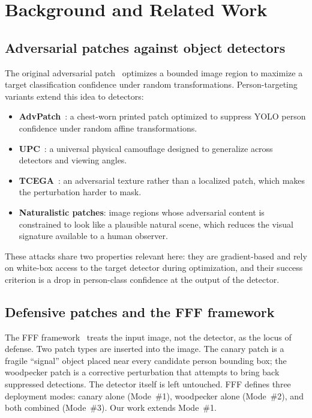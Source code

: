 \documentclass[conference]{IEEEtran}
\begin{document}
\section{Background and Related Work}
\label{sec:bg}

\subsection{Adversarial patches against object detectors}

The original adversarial patch~\cite{brown2017adversarial} optimizes a
bounded image region to maximize a target classification confidence under
random transformations. Person-targeting variants extend this idea to
detectors:

\begin{itemize}[leftmargin=*]
    \item \textbf{AdvPatch}~\cite{thys2019fooling}: a chest-worn printed
    patch optimized to suppress YOLO person confidence under random affine
    transformations.
    \item \textbf{UPC}~\cite{huang2020upc}: a universal physical camouflage
    designed to generalize across detectors and viewing angles.
    \item \textbf{TCEGA}~\cite{hu2022tcega}: an adversarial texture rather
    than a localized patch, which makes the perturbation harder to mask.
    \item \textbf{Naturalistic patches}: image regions whose adversarial
    content is constrained to look like a plausible natural scene, which
    reduces the visual signature available to a human observer.
\end{itemize}

These attacks share two properties relevant here: they are gradient-based
and rely on white-box access to the target detector during optimization,
and their success criterion is a drop in person-class confidence at the
output of the detector.

\subsection{Defensive patches and the FFF framework}

The FFF framework~\cite{feng2025fff} treats the input image, not the
detector, as the locus of defense. Two patch types are inserted into the
image. The canary patch is a fragile ``signal'' object placed near every
candidate person bounding box; the woodpecker patch is a corrective
perturbation that attempts to bring back suppressed detections. The
detector itself is left untouched. FFF defines three deployment modes:
canary alone (Mode~\#1), woodpecker alone (Mode~\#2), and both combined
(Mode~\#3). Our work extends Mode~\#1.
\end{document}
